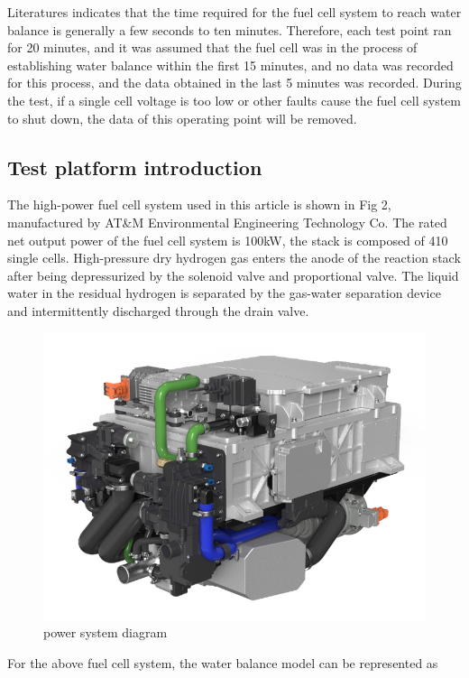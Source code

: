 Literatures\cite{wuDiagnosticToolsPEM2008} indicates that the time required for the fuel cell system to reach water balance is generally a few seconds to ten minutes. Therefore, each test point ran for 20 minutes, and it was assumed that the fuel cell was in the process of establishing water balance within the first 15 minutes, and no data was recorded for this process, and the data obtained in the last 5 minutes was recorded. During the test, if a single cell voltage is too low or other faults cause the fuel cell system to shut down, the data of this operating point will be removed.


\subsection{Test platform introduction}
The high-power fuel cell system used in this article is shown in Fig 2, manufactured by AT\&M Environmental Engineering Technology Co. The rated net output power of the fuel cell system is 100kW, the stack is composed of 410 single cells. High-pressure dry hydrogen gas enters the anode of the reaction stack after being depressurized by the solenoid valve and proportional valve. The liquid water in the residual hydrogen is separated by the gas-water separation device and intermittently discharged through the drain valve.
\begin{figure}[h]
    \centering
    \label{fig:PowerSystemDiagram}
    \includegraphics[scale=0.4]{Research_pictures/picture2.png}
    \caption[short]{power system diagram}
\end{figure}

For the above fuel cell system, the water balance model can be represented as

